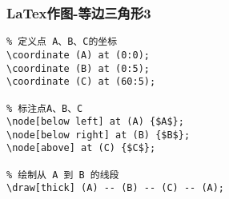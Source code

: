 \begin{frame}[fragile]
\frametitle{LaTex作图-等边三角形3}

\begin{verbatim}
% 定义点 A、B、C的坐标
\coordinate (A) at (0:0);
\coordinate (B) at (0:5);
\coordinate (C) at (60:5);

% 标注点A、B、C
\node[below left] at (A) {$A$};
\node[below right] at (B) {$B$};
\node[above] at (C) {$C$};

% 绘制从 A 到 B 的线段
\draw[thick] (A) -- (B) -- (C) -- (A);
\end{verbatim}
\end{frame}

